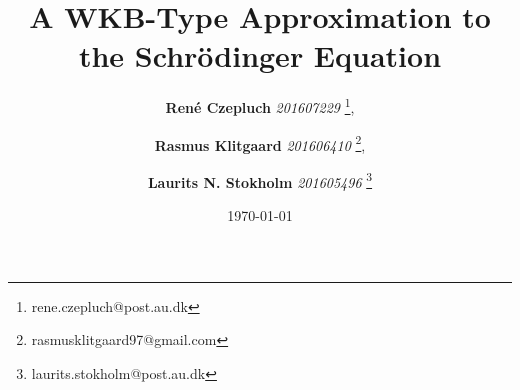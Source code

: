 \documentclass[danish, a4paper, 11pt, onecolumn, oneside]{memoir}
\title{A WKB-Type Approximation to the Schrödinger Equation}
\author{%
        \textbf{René Czepluch} \textit{201607229}       \thanks{rene.czepluch@post.au.dk},
   \and \textbf{Rasmus Klitgaard} \textit{201606410}    \thanks{rasmusklitgaard97@gmail.com},
   \and \textbf{Laurits N. Stokholm} \textit{201605496} \thanks{laurits.stokholm@post.au.dk}
   }
\date{\today}
\begin{document}
\begin{titlingpage}
\maketitle
\end{titlingpage}
\noindent








\printbibliography[heading=secbib]
\nocite{*}
\end{document}
